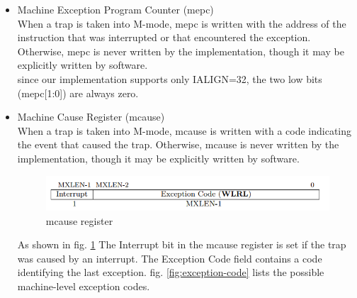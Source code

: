 \documentclass[../main.tex]{subfiles}
\begin{document}
\begin{itemize}
\begin{itemize}
            \item Machine Exception Program Counter (mepc)\\
            When a trap is taken into M-mode, mepc is written with the address of the instruction that was interrupted or that encountered the exception. Otherwise, mepc is never written by the implementation, though it may be explicitly written by software.\\
            since our implementation supports only IALIGN=32, the two low bits (mepc[1:0]) are always zero.\\
            
            \item Machine Cause Register (mcause)\\
            When a trap is taken into M-mode, mcause is written with a code indicating the event that caused the trap. Otherwise, mcause is never written by the implementation, though it may be explicitly written by software.\\
            \begin{figure}[h]
            \centering
            \includegraphics[width=10 cm]{diagrams/mcause.png}
            \caption{mcause register}
            \label{fig:mcause}
            \end{figure}As shown in fig. \ref{fig:mcause}
            The Interrupt bit in the mcause register is set if the trap was caused by an interrupt. The Exception Code field contains a code identifying the last exception. 
            fig. \ref{fig:exception-code} lists the possible machine-level exception codes.\\
            \begin{figure}[h!]
            \centering

\end{figure}
\end{itemize}
\end{itemize}
\end{document}
